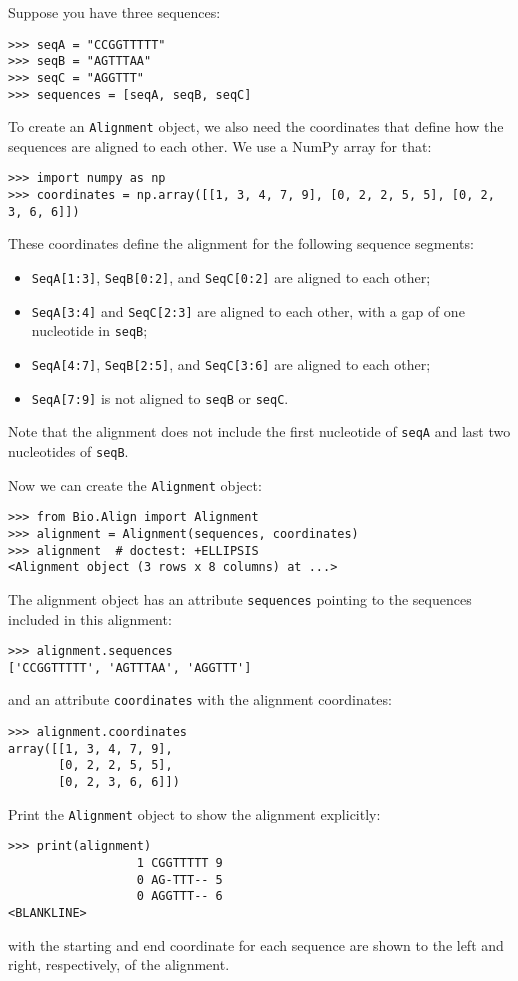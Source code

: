 Suppose you have three sequences:
\begin{verbatim}
>>> seqA = "CCGGTTTTT"
>>> seqB = "AGTTTAA"
>>> seqC = "AGGTTT"
>>> sequences = [seqA, seqB, seqC]
\end{verbatim}
To create an \verb|Alignment| object, we also need the coordinates that define how the sequences are aligned to each other. We use a NumPy array for that:
\begin{verbatim}
>>> import numpy as np
>>> coordinates = np.array([[1, 3, 4, 7, 9], [0, 2, 2, 5, 5], [0, 2, 3, 6, 6]])
\end{verbatim}
These coordinates define the alignment for the following sequence segments:
\begin{itemize}
\item \verb|SeqA[1:3]|, \verb|SeqB[0:2]|, and \verb|SeqC[0:2]| are aligned to each other;
\item \verb|SeqA[3:4]| and \verb|SeqC[2:3]| are aligned to each other, with a gap of one nucleotide in \verb|seqB|;
\item \verb|SeqA[4:7]|, \verb|SeqB[2:5]|, and \verb|SeqC[3:6]| are aligned to each other;
\item \verb|SeqA[7:9]| is not aligned to \verb|seqB| or \verb|seqC|.
\end{itemize}
Note that the alignment does not include the first nucleotide of \verb|seqA| and last two nucleotides of \verb|seqB|.

Now we can create the \verb|Alignment| object:
\begin{verbatim}
>>> from Bio.Align import Alignment
>>> alignment = Alignment(sequences, coordinates)
>>> alignment  # doctest: +ELLIPSIS
<Alignment object (3 rows x 8 columns) at ...>
\end{verbatim}
The alignment object has an attribute \verb|sequences| pointing to the sequences included in this alignment:
\begin{verbatim}
>>> alignment.sequences
['CCGGTTTTT', 'AGTTTAA', 'AGGTTT']
\end{verbatim}
and an attribute \verb|coordinates| with the alignment coordinates:
\begin{verbatim}
>>> alignment.coordinates
array([[1, 3, 4, 7, 9],
       [0, 2, 2, 5, 5],
       [0, 2, 3, 6, 6]])
\end{verbatim}
Print the \verb+Alignment+ object to show the alignment explicitly:
\begin{verbatim}
>>> print(alignment)
                  1 CGGTTTTT 9
                  0 AG-TTT-- 5
                  0 AGGTTT-- 6
<BLANKLINE>
\end{verbatim}
with the starting and end coordinate for each sequence are shown to the left and right, respectively, of the alignment.

